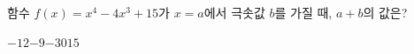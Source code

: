 함수 $f(x)=x^4-4x^3+15$가 $x=a$에서 극솟값 $b$를 가질 때, $a+b$의 값은?
\begin{choices32}{$-12$}{$-9$}{$-3$}{$0$}{$15$}\end{choices32}
